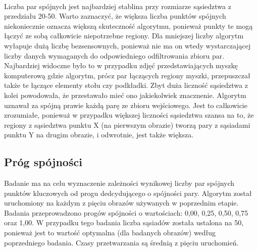 \documentclass[../main.tex]{subfiles}
\begin{document}
    \paragraph{}
    Liczba par spójnych jest najbardziej stablina przy rozmiarze sąsiedztwa z przedziału 20-50. Warto zaznaczyć, że większa liczba punktów spójnych niekoniecznie oznacza większą skuteczność algorytmu, ponieważ punkty te mogą łączyć ze sobą całkowicie niepotrzebne regiony. Dla mniejszej liczby algorytm wyłapuje dużą liczbę bezsensownych, ponieważ nie ma on wtedy wystarczającej liczby danych wymaganych do odpowiedniego odfiltrowania zbioru par. 
    \newline
    Najbardziej widoczne było to w przypadku zdjęć przedstawiających myszkę komputerową gdzie algorytm, prócz par łączących regiony myszki, przepuszczał także te łączące elementy stołu czy podkładki.
    \newline
    Zbyt duża liczność sąsiedztwa z kolei powodowała, że przestawało mieć ono jakiekolwiek znacznenie. Algorytm uznawał za spójną prawie każdą parę ze zbioru wejściowego. Jest to całkowicie zrozumiałe, ponieważ w przypadku większej liczności sąsiedztwa szansa na to, że regiony z sąsiedztwa punktu X (na pierwszym obrazie) tworzą pary z sąsiadami punktu Y na drugim obrazie, i odwrotnie, jest także większa.
    
    \subsection{Próg spójności}
    Badanie ma na celu wyznaczenie zależności wynikowej liczby par spójnych punktów kluczowych od progu dedcydującego o spójności pary. Algorytm został uruchomiony na każdym z pięciu obrazów używanych w poprzednim etapie. Badania przeprowadzono progów spójności o wartościach: 0,00, 0,25, 0,50, 0,75 oraz 1,00. W przypadku tego badania liczba sąsiadów została ustalona na 50, ponieważ jest to wartość optymalna (dla badanych obrazów) według poprzedniego badania. Czasy przetwarzania są średnią z pięciu uruchomień.
    
\end{document}
